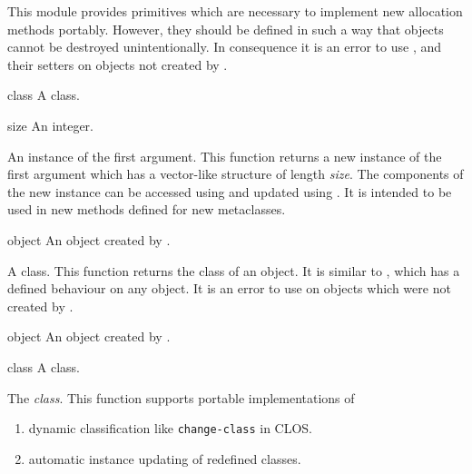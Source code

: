 %
\begin{optDefinition}
This module provides primitives which are necessary to implement new allocation
methods portably. However, they should be defined in such a way that objects
cannot be destroyed unintentionally.  In consequence it is an error to use
,  and their setters
on objects not created by .

%
\begin{arguments}
    \item[class] A class.
    \item[size] An integer.
\end{arguments}
%
\result%
An instance of the first argument.
%
\remarks%
This function returns a new instance of the first argument which has a
vector-like structure of length {\em size}. The components of the new instance
can be accessed using  and updated using
.  It is intended to be used in new
 methods defined for new metaclasses.

%
\begin{arguments}
    \item[object] An object created by .
\end{arguments}
%
\result%
A class.
%
\remarks%
This function returns the class of an object. It is similar to
, which has a defined behaviour on any object. It is an
error to use  on objects which were not created
by .

%
\begin{arguments}
    \item[object] An object created by .
    \item[class] A class.
\end{arguments}
%
\result%
The {\em class}.
%
\remarks%
This function supports portable implementations of
\begin{enumerate}
    \item dynamic classification like {\tt change-class} in CLOS.
    \item automatic instance updating of redefined classes.
\end{enumerate}


\end{optDefinition}
